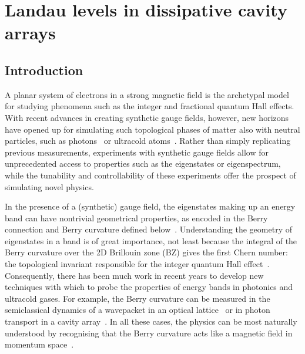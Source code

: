

\chapter{Landau levels in dissipative cavity arrays}
\label{cha:landau}

\section{Introduction}

A planar system of electrons in a
strong magnetic field is the archetypal model for studying phenomena such as the
integer and fractional quantum Hall effects. With recent advances in creating
synthetic gauge fields, however, new horizons have opened up for simulating such topological phases of matter also with neutral particles, such as photons~\cite{hafezi2014synthetic} or ultracold atoms~\cite{dalibardrmp2011, goldman_repprog_2014, Goldman_arxiv_2015}. 
Rather than simply replicating previous measurements, experiments with synthetic gauge fields allow for unprecedented access to properties such as the eigenstates or eigenspectrum, while the tunability and controllability of these experiments offer the prospect of simulating novel physics. 

In the presence of a (synthetic) gauge field, the eigenstates making up an energy band can have nontrivial geometrical properties, as encoded in the Berry connection and Berry curvature defined below~\cite{berry, xiao2010berryreview}. Understanding the geometry of eigenstates in a band is of great importance, not least because the integral of the Berry curvature over the 2D Brillouin zone (BZ) gives the first Chern number: the topological invariant responsible for the integer quantum Hall effect~\cite{thouless}. Consequently, there has been much work in recent years to develop new techniques with which to probe the properties of energy bands in photonics and ultracold gases. For example, the Berry curvature can be measured in the semiclassical dynamics of a wavepacket in an optical lattice~\cite{dudarev,1chang, price, cominotti, dauphin, aidelsburger2015measuring, jotzu2014experimental} or in photon transport in a cavity array~\cite{ozawa2014qhe}. In all these cases, the physics can be most naturally understood by recognising that the Berry curvature acts like a magnetic field in momentum space~\cite{berry, bliokh2005spin, PhysRevD.12.3845, cooper2012designing}. 

